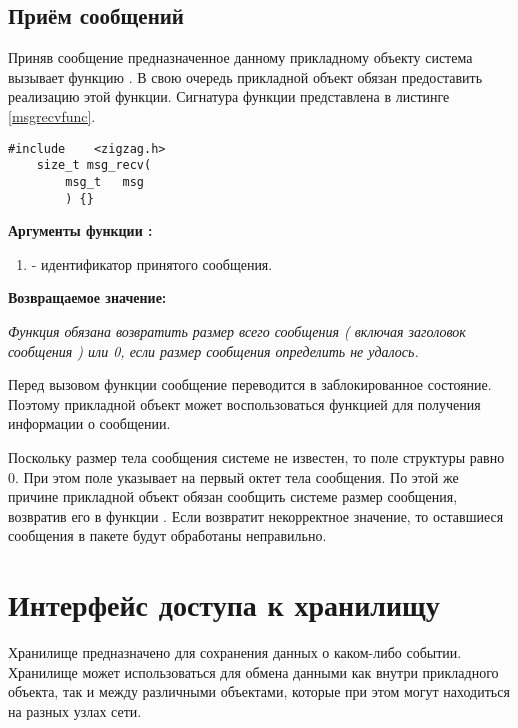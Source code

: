 \subsection{Приём сообщений}

Приняв сообщение предназначенное данному прикладному объекту система \zigzag вызывает функцию
. В свою очередь прикладной объект обязан предоставить реализацию этой функции.
Сигнатура функции представлена в листинге \ref{msgrecvfunc}.

\begin{lstlisting}[caption=Функция \myfunc{msg\_recv()} - приём сообщения., label=msgrecvfunc ]
    #include    <zigzag.h>
    size_t msg_recv(
        msg_t   msg
        ) {}
\end{lstlisting}

{\bfseries Аргументы функции :}

{\itshape
\begin{enumerate} 
\item {} - идентификатор принятого сообщения.
\end{enumerate}
}

{\bfseries Возвращаемое значение:}

{\itshape
Функция обязана возвратить размер всего сообщения ( включая заголовок сообщения ) или 0, если размер
сообщения определить не удалось.
}

Перед вызовом функции  сообщение переводится в заблокированное состояние. Поэтому прикладной
объект может воспользоваться функцией  для получения информации о сообщении.

Поскольку размер тела сообщения системе не известен, то поле  структуры  равно 0. При этом поле
 указывает на первый октет тела сообщения. По этой же причине прикладной объект обязан сообщить
системе размер сообщения, возвратив его в функции . Если  возвратит 
некорректное значение, то оставшиеся сообщения в пакете будут обработаны неправильно.

\section{Интерфейс доступа к хранилищу}
Хранилище предназначено для сохранения данных о каком-либо событии. Хранилище может использоваться для
обмена данными как внутри прикладного объекта, так и между различными объектами, которые при этом могут находиться
на разных узлах сети. 

